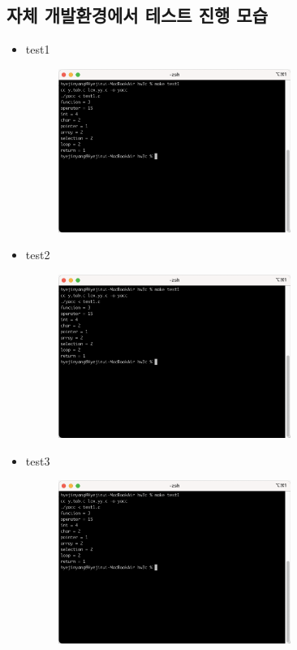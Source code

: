 \documentclass{article}
\begin{document}
\newpage

\subsection{자체 개발환경에서 테스트 진행 모습}
\begin{itemize}
	\item {test1}
	\begin{figure}[!htbp]
		\begin{center}
			\includegraphics[width=215pt]{hw3_maketest1.png}
		\end{center}
	\end{figure}
	\item {test2}
	\begin{figure}[!htbp]
		\begin{center}
			\includegraphics[width=215pt]{hw3_maketest1.png}
		\end{center}
	\end{figure}
	\item {test3}
	\begin{figure}[!htbp]
		\begin{center}
			\includegraphics[width=215pt]{hw3_maketest1.png}
		\end{center}
	\end{figure}
\end{itemize}
\end{document}
